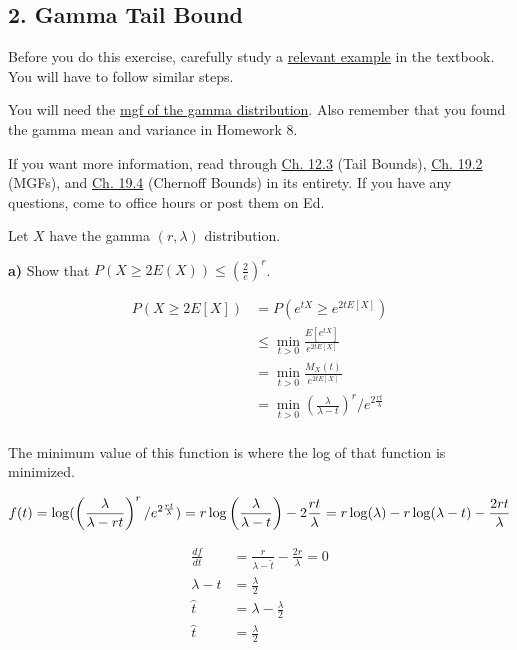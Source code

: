 \documentclass[11pt]{article}
\begin{document}
    \newpage

    \hypertarget{gamma-tail-bound}{%
\subsection{2. Gamma Tail Bound}\label{gamma-tail-bound}}

Before you do this exercise, carefully study a
\href{https://data140.org/textbook/content/chapter-19/chernoff-bound/\#application-to-the-normal-distribution}{relevant
example} in the textbook. You will have to follow similar steps.

You will need the
\href{https://data140.org/textbook/content/chapter-19/moment-generating-functions/\#mgf-of-a-gamma-r-lambda-random-variable}{mgf
of the gamma distribution}. Also remember that you found the gamma mean
and variance in Homework 8.

If you want more information, read through
\href{https://data140.org/textbook/content/chapter-12/bounds/}{Ch. 12.3}
(Tail Bounds),
\href{https://data140.org/textbook/content/chapter-19/moment-generating-functions/}{Ch.
19.2} (MGFs), and
\href{https://data140.org/textbook/content/chapter-19/chernoff-bound/}{Ch.
19.4} (Chernoff Bounds) in its entirety. If you have any questions, come
to office hours or post them on Ed.

Let \(X\) have the gamma \((r, \lambda)\) distribution.

\textbf{a)} Show that \(P(X \ge 2E(X)) \le \left(\frac{2}{e}\right)^r\).


\begin{align*}
	P(X \ge 2E[X]) &= P(e^{tX} \ge e^{2tE[X]})  \\
		       &\le \min_{t>0}\frac{E[e^{tX}]}{e^{2tE[X]}} \\
		       &= \min_{t>0} \frac{M_{X}(t)}{e^{2tE[X]}} \\
		       &= \min_{t>0}\left( \frac{\lambda}{\lambda-t} \right) ^{r} / e^{2 \frac{rt}{\lambda}}  \\
\end{align*}

The minimum value of this function is where the log of that function is minimized.

$$
	f(t) = \log (\left( \frac{\lambda}{\lambda - rt} \right) ^{r} / e^{2 \frac{rt}{\lambda}}) = r\log\left( \frac{\lambda}{\lambda-t} \right) - 2 \frac{rt}{\lambda} = r\log(\lambda) - r\log(\lambda-t) - \frac{2rt}{\lambda}\\
$$

\begin{align*}
	\frac{df}{dt} &= \frac{r}{\lambda - \hat t} - \frac{2r}{\lambda} = 0\\
	\lambda - \hat t &= \frac{\lambda}{2} \\
	\hat t &= \lambda - \frac{\lambda}{2}  \\
	\hat t &= \frac{\lambda}{2} \\
\end{align*}
\end{document}
